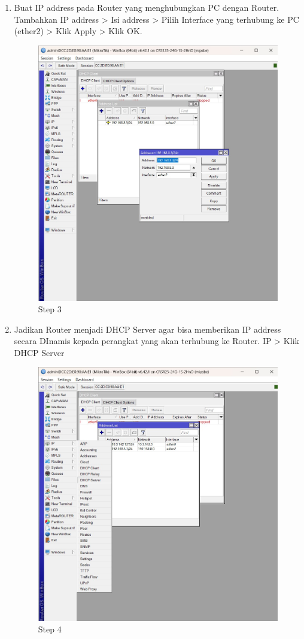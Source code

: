 \begin{enumerate}
	\item Buat IP address pada Router yang menghubungkan PC dengan Router. Tambahkan IP address
	> Isi address > Pilih Interface yang terhubung ke PC (ether2) > Klik Apply > Klik OK.
	\begin{figure}[H]
		\centering
		\includegraphics[width=0.5\linewidth]{P3/img/step3.jpg}
		\caption{Step 3}
		\label{fig:gambar3}
	\end{figure}

	\item Jadikan Router menjadi DHCP Server agar bisa memberikan IP address secara DInamis kepada perangkat yang akan terhubung ke Router. IP > Klik DHCP Server
	\begin{figure}[H]
		\centering
		\includegraphics[width=0.5\linewidth]{P3/img/step4.jpg}
		\caption{Step 4}
		\label{fig:gambar4}
	\end{figure}


\end{enumerate}
